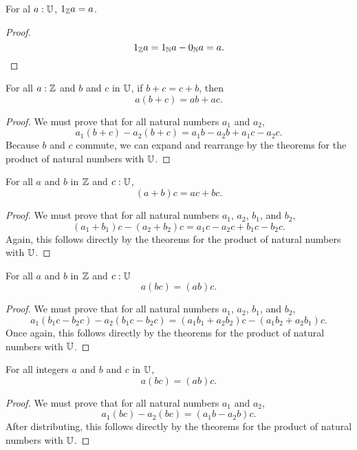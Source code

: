\documentclass[../../math.tex]{subfiles}
\begin{document}
\begin{theorem}
    For al $a : \mathbb{U}$, $1_{\mathbb{Z}} a = a$.
\end{theorem}
\begin{proof}
    \[
        1_{\mathbb{Z}} a = 1_{\mathbb{N}} a - 0_{\mathbb{N}} a = a.
    \]
\end{proof}

\begin{theorem}
    For all $a : \mathbb{Z}$ and $b$ and $c$ in $\mathbb{U}$, if $b + c = c + b$, then
    \[
        a(b + c) = ab + ac.
    \]
\end{theorem}
\begin{proof}
    We must prove that for all natural numbers $a_1$ and $a_2$,
    \[
        a_1(b + c) - a_2(b + c) = a_1b - a_2b + a_1c - a_2c.
    \]
    Because $b$ and $c$ commute, we can expand and rearrange by the theorems for
    the product of natural numbers with $\mathbb{U}$.
\end{proof}

\begin{theorem}
    For all $a$ and $b$ in $\mathbb{Z}$ and $c : \mathbb{U}$,
    \[
        (a + b)c = ac + bc.
    \]
\end{theorem}
\begin{proof}
    We must prove that for all natural numbers $a_1$, $a_2$, $b_1$, and $b_2$,
    \[
        (a_1 + b_1)c - (a_2 + b_2)c = a_1c - a_2 c + b_1c - b_2c.
    \]
    Again, this follows directly by the theorems for the product of natural
    numbers with $\mathbb{U}$.
\end{proof}

\begin{theorem}
    For all $a$ and $b$ in $\mathbb{Z}$ and $c : \mathbb{U}$
    \[
        a(bc) = (ab)c.
    \]
\end{theorem}
\begin{proof}
    We must prove that for all natural numbers $a_1$, $a_2$, $b_1$, and $b_2$,
    \[
        a_1(b_1c - b_2c) - a_2(b_1c - b_2c) =
        (a_1b_1 + a_2b_2)c - (a_1b_2 + a_2b_1)c.
    \]
    Once again, this follows directly by the theorems for the product of natural
    numbers with $\mathbb{U}$.
\end{proof}

\begin{theorem}
    For all integers $a$ and $b$ and $c$ in $\mathbb{U}$,
    \[
        a(bc) = (ab)c.
    \]
\end{theorem}
\begin{proof}
    We must prove that for all natural numbers $a_1$ and $a_2$,
    \[
        a_1(bc) - a_2(bc) =
        (a_1b - a_2b)c.
    \]
    After distributing, this follows directly by the theorems for the product of
    natural numbers with $\mathbb{U}$.
\end{proof}
\end{document}
